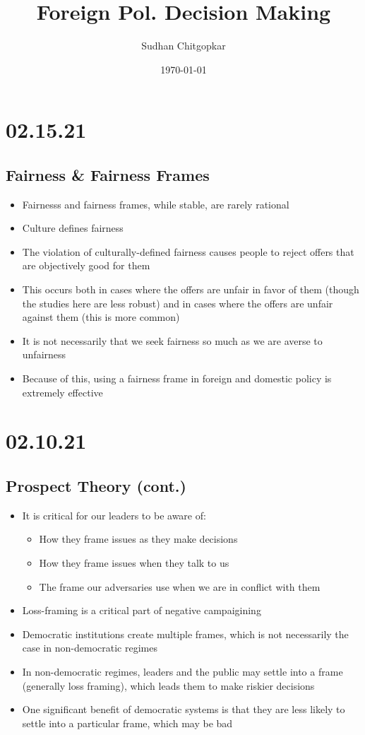 \documentclass[11pt]{article}
\author{Sudhan Chitgopkar}
\date{\today}
\title{Foreign Pol. Decision Making}
\begin{document}
\maketitle
\section*{02.15.21}
\label{sec:org1d9a1d6}
\subsection*{Fairness \& Fairness Frames}
\label{sec:org0192469}
\begin{itemize}
\item Fairnesss and fairness frames, while stable, are rarely rational
\item Culture defines fairness
\item The violation of culturally-defined fairness causes people to reject offers that are objectively good for them
\item This occurs both in cases where the offers are unfair in favor of them (though the studies here are less robust) and in cases where the offers are unfair against them (this is more common)
\item It is not necessarily that we seek fairness so much as we are averse to unfairness
\item Because of this, using a fairness frame in foreign and domestic policy is extremely effective
\end{itemize}
\section*{02.10.21}
\label{sec:org9ce4508}
\subsection*{Prospect Theory (cont.)}
\label{sec:orgf623cce}
\begin{itemize}
\item It is critical for our leaders to be aware of:
\begin{itemize}
\item How they frame issues as they make decisions
\item How they frame issues when they talk to us
\item The frame our adversaries use when we are in conflict with them
\end{itemize}
\item Loss-framing is a critical part of negative campaigining
\item Democratic institutions create multiple frames, which is not necessarily the case in non-democratic regimes
\item In non-democratic regimes, leaders and the public may settle into a frame (generally loss framing), which leads them to make riskier decisions
\item One significant benefit of democratic systems is that they are less likely to settle into a particular frame, which may be bad
\end{itemize}
\end{document}
